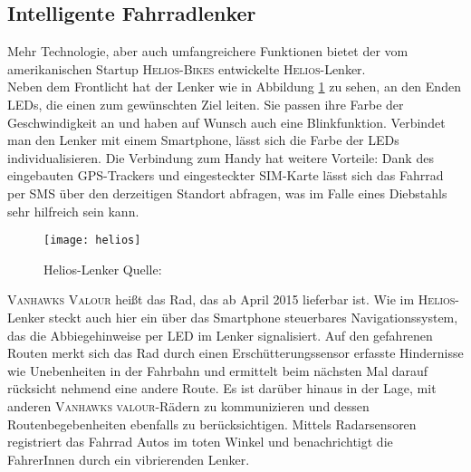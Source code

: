 \subsection{Intelligente Fahrradlenker}
Mehr Technologie, aber auch umfangreichere Funktionen bietet der vom amerikanischen Startup \textsc{Helios-Bikes} entwickelte \textsc{Helios}-Lenker.\\ 
Neben dem Frontlicht hat der Lenker wie in Abbildung \ref{fig:helios} zu sehen, an den Enden \glspl{LED}, die einen zum gewünschten Ziel leiten. Sie passen ihre Farbe der Geschwindigkeit an und haben auf Wunsch auch eine Blinkfunktion. Verbindet man den Lenker mit einem \gls{Smartphone}, lässt sich die Farbe der \glspl{LED} individualisieren. Die Verbindung zum Handy hat weitere Vorteile: Dank des eingebauten \gls{GPS}-Trackers und eingesteckter SIM-Karte lässt sich das Fahrrad per SMS über den derzeitigen Standort abfragen\cite{Helios}, was im Falle eines Diebstahls sehr hilfreich sein kann.\\ 
\begin{figure}[H]
    \centering
    \texttt{[image: helios]}
    \grayRule
    \caption[Helios-Lenker]{Helios-Lenker  Quelle: \cite{Helios}}		
    \label{fig:helios}
\end{figure}
\textsc{Vanhawks Valour} heißt das Rad, das ab April 2015 lieferbar ist. Wie im \textsc{Helios}-Lenker steckt auch hier ein über das \gls{Smartphone} steuerbares Navigationssystem, das die Abbiegehinweise per \gls{LED} im Lenker signalisiert. Auf den gefahrenen Routen merkt sich das Rad durch einen Erschütterungssensor erfasste Hindernisse wie Unebenheiten in der Fahrbahn und ermittelt beim nächsten Mal darauf rücksicht nehmend eine andere Route. Es ist darüber hinaus in der Lage, mit anderen \textsc{Vanhawks valour}-Rädern zu kommunizieren und dessen Routenbegebenheiten ebenfalls zu berücksichtigen. Mittels Radarsensoren registriert das Fahrrad Autos im toten Winkel und benachrichtigt die FahrerInnen durch ein vibrierenden Lenker. \cite{vanhawks}
